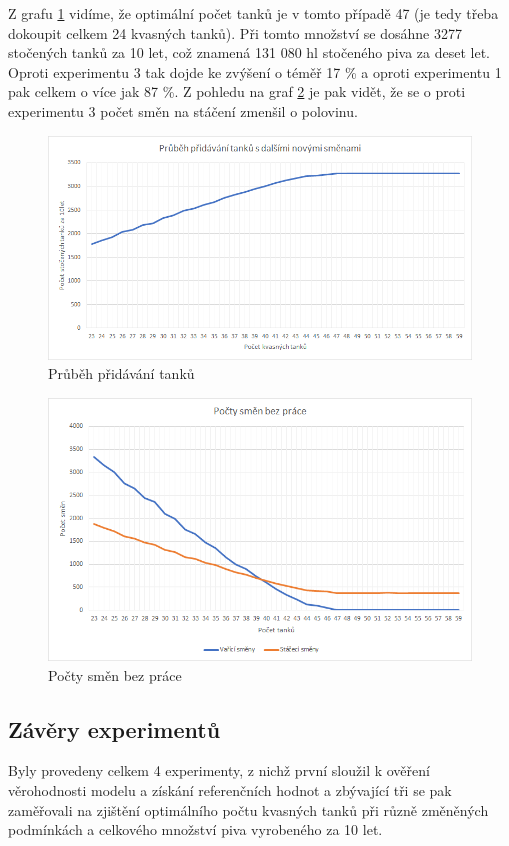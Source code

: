\documentclass[11pt,a4paper]{article}
\begin{document}
Z grafu \ref{fig:exp4tanky} vidíme, že optimální počet tanků je v tomto případě 47 (je tedy třeba dokoupit celkem 24 kvasných tanků). Při tomto množství se dosáhne 3277 stočených tanků za 10 let, což znamená 131 080 hl stočeného piva za deset let. Oproti experimentu 3 tak dojde ke zvýšení o téměř 17 \% a oproti experimentu 1 pak celkem o více jak 87 \%. Z pohledu na graf \ref{fig:exp4smeny} je pak vidět, že se o proti experimentu 3 počet směn na stáčení zmenšil o polovinu.

\begin{figure}[H]
  \centering
  \includegraphics[width=15cm]{exp4tanky.png}
  \caption{Průběh přidávání tanků}
  \label{fig:exp4tanky}
\end{figure}

\begin{figure}[H]
  \centering
  \includegraphics[width=15cm]{exp4smeny.png}
  \caption{Počty směn bez práce}
  \label{fig:exp4smeny}
\end{figure}

\subsection{Závěry experimentů}
Byly provedeny celkem 4 experimenty, z nichž první sloužil k ověření věrohodnosti modelu a získání referenčních hodnot a zbývající tři se pak zaměřovali na zjištění optimálního počtu kvasných tanků při různě změněných podmínkách a celkového množství piva vyrobeného za 10 let.
\end{document}
